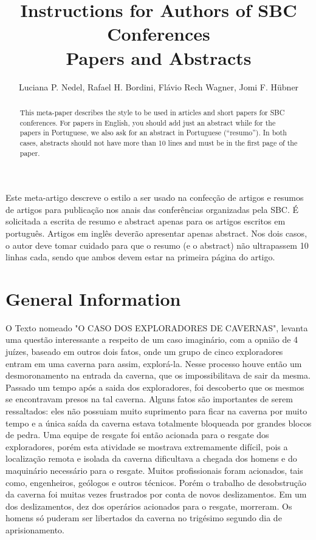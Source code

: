 \documentclass[12pt]{article}
\title{Instructions for Authors of SBC Conferences\\ Papers and Abstracts}
\author{Luciana P. Nedel\inst{1}, Rafael H. Bordini\inst{2}, Flávio Rech
  Wagner\inst{1}, Jomi F. Hübner\inst{3} }
\begin{document}
 

\maketitle

\begin{abstract}
  This meta-paper describes the style to be used in articles and short papers
  for SBC conferences. For papers in English, you should add just an abstract
  while for the papers in Portuguese, we also ask for an abstract in
  Portuguese (``resumo''). In both cases, abstracts should not have more than
  10 lines and must be in the first page of the paper.
\end{abstract}
     
\begin{resumo} 
  Este meta-artigo descreve o estilo a ser usado na confecção de artigos e
  resumos de artigos para publicação nos anais das conferências organizadas
  pela SBC. É solicitada a escrita de resumo e abstract apenas para os artigos
  escritos em português. Artigos em inglês deverão apresentar apenas abstract.
  Nos dois casos, o autor deve tomar cuidado para que o resumo (e o abstract)
  não ultrapassem 10 linhas cada, sendo que ambos devem estar na primeira
  página do artigo.
\end{resumo}


\section{General Information}

O Texto nomeado "O CASO DOS EXPLORADORES DE CAVERNAS", levanta uma questão interessante a respeito de um caso imaginário, com a opnião de 4 juízes, baseado em outros dois fatos, onde um grupo de cinco exploradores entram em uma caverna para assim, explorá-la. Nesse processo houve então um desmoronamento na entrada da caverna, que os impossibilitava de sair da mesma. Passado um tempo após a saida dos exploradores, foi descoberto que os mesmos se encontravam presos na tal caverna. Alguns fatos são importantes de serem ressaltados: eles não possuiam muito suprimento para ficar na caverna por muito tempo e a única saída da caverna estava totalmente bloqueada por grandes blocos de pedra. Uma equipe de resgate foi então acionada para o resgate dos exploradores, porém esta atividade se mostrava extremamente difícil, pois a localização remota e isolada da caverna dificultava a chegada dos homens e do maquinário necessário para o resgate. Muitos profissionais foram acionados, tais como, engenheiros, geólogos e outros técnicos. Porém o trabalho de desobstrução da caverna foi muitas vezes frustrados por conta de novos deslizamentos. Em um dos deslizamentos, dez dos operários acionados para o resgate, morreram. Os homens só puderam ser libertados da caverna no trigésimo segundo dia de aprisionamento.
\end{document}
